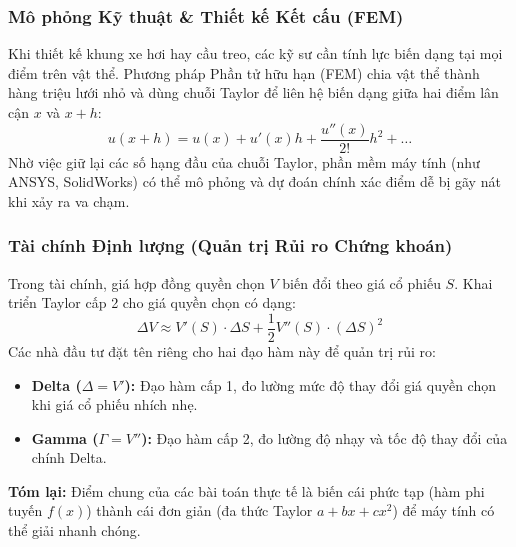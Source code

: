 \documentclass[12pt]{article}
\theoremstyle{definition}
\theoremstyle{remark}
\begin{document}
\begin{note}
\subsubsection{Mô phỏng Kỹ thuật \& Thiết kế Kết cấu (FEM)}
Khi thiết kế khung xe hơi hay cầu treo, các kỹ sư cần tính lực biến dạng tại mọi điểm trên vật thể. Phương pháp Phần tử hữu hạn (FEM) chia vật thể thành hàng triệu lưới nhỏ và dùng chuỗi Taylor để liên hệ biến dạng giữa hai điểm lân cận $x$ và $x + h$:
\begin{equation}
    u(x + h) = u(x) + u'(x)h + \frac{u''(x)}{2!}h^2 + \dots
\end{equation}
Nhờ việc giữ lại các số hạng đầu của chuỗi Taylor, phần mềm máy tính (như ANSYS, SolidWorks) có thể mô phỏng và dự đoán chính xác điểm dễ bị gãy nát khi xảy ra va chạm.

\subsubsection{ Tài chính Định lượng (Quản trị Rủi ro Chứng khoán)}
Trong tài chính, giá hợp đồng quyền chọn $V$ biến đổi theo giá cổ phiếu $S$. Khai triển Taylor cấp 2 cho giá quyền chọn có dạng:
\begin{equation}
    \Delta V \approx V'(S) \cdot \Delta S + \frac{1}{2} V''(S) \cdot (\Delta S)^2
\end{equation}
Các nhà đầu tư đặt tên riêng cho hai đạo hàm này để quản trị rủi ro:
\begin{itemize}
    \item \textbf{Delta ($\Delta = V'$):} Đạo hàm cấp 1, đo lường mức độ thay đổi giá quyền chọn khi giá cổ phiếu nhích nhẹ.
    \item \textbf{Gamma ($\Gamma = V''$):} Đạo hàm cấp 2, đo lường độ nhạy và tốc độ thay đổi của chính Delta.
\end{itemize}

\begin{note}
\textbf{Tóm lại:} Điểm chung của các bài toán thực tế là biến cái phức tạp (hàm phi tuyến $f(x)$) thành cái đơn giản (đa thức Taylor $a + bx + cx^2$) để máy tính có thể giải nhanh chóng.
\end{note}

\end{note}
\end{document}
